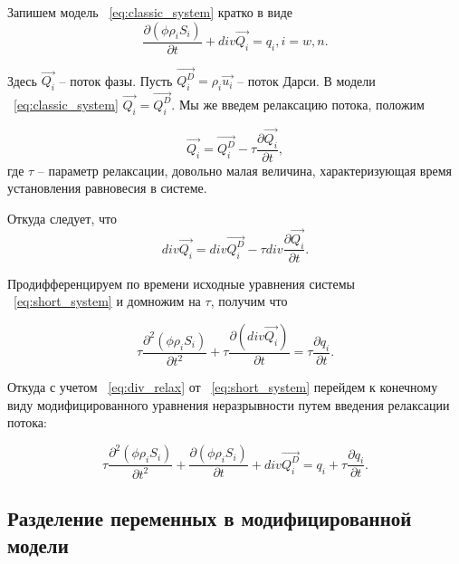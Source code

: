 Запишем модель ~\eqref{eq:classic_system} кратко в виде
\begin{equation} \label{eq:short_system}
   \frac{\partial (\phi \rho_i S_i)}{\partial t} + div \overrightarrow{Q_i} = q_i, i = w,n.
\end{equation}

Здесь $\overrightarrow{Q_i}$ -- поток фазы.
Пусть $\overrightarrow{Q_i^D} = \rho_i \overrightarrow{u_i}$ -- поток Дарси.
В модели ~\eqref{eq:classic_system} $\overrightarrow{Q_i} = \overrightarrow{Q_i^D}$.
Мы же введем релаксацию потока, положим 

\begin{equation}
 \overrightarrow{Q_i} = \overrightarrow{Q_i^D} - \tau \dfrac{\partial \overrightarrow{Q_i}}{\partial t},
\end{equation}
где $\tau$ -- параметр релаксации, довольно малая величина, характеризующая время установления равновесия в системе.

Откуда следует, что
\begin{equation} \label{eq:div_relax}
 div\overrightarrow{Q_i} = div\overrightarrow{Q_i^D} - \tau div\dfrac{\partial \overrightarrow{Q_i}}{\partial t}.
\end{equation}

Продифференцируем по времени исходные уравнения системы ~\eqref{eq:short_system} и домножим на $\tau$, получим что

\begin{equation}
  \tau \frac{\partial^2 (\phi \rho_i S_i)}{\partial t^2} + \tau \frac{\partial (div \overrightarrow{Q_i})}{\partial t} = \tau \frac{\partial q_i}{\partial t}.
\end{equation}

Откуда с учетом ~\eqref{eq:div_relax} от ~\eqref{eq:short_system} перейдем к конечному виду модифицированного уравнения неразрывности
путем введения релаксации потока:

\begin{equation} \label{eq:mod_system}
  \tau \frac{\partial^2 (\phi \rho_i S_i)}{\partial t^2} + \frac{\partial (\phi \rho_i S_i)}{\partial t} + div \overrightarrow{Q_i^D} = q_i + \tau \frac{\partial q_i}{\partial t}.
\end{equation}



\subsection{Разделение переменных в модифицированной модели}

